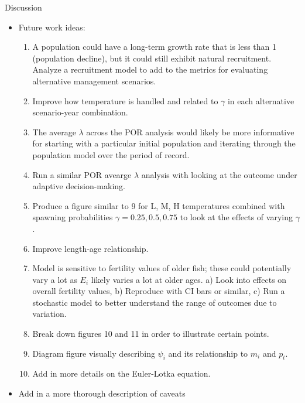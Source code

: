 \documentclass[12pt]{article}
\begin{document}
\begin{section}{Discussion}
\begin{itemize}
\item Future work ideas: 
	\begin{enumerate}
	\item A population could have a long-term growth rate that is less than 1 (population decline), but it could still exhibit natural recruitment.  Analyze a recruitment model to add to the metrics for evaluating alternative management scenarios.
	\item Improve how temperature is handled and related to $\gamma$ in each alternative scenario-year combination.
	\item The average $\lambda$ across the POR analysis would likely be more informative for starting with a particular initial population and iterating through the population model over the period of record.
	\item Run a similar POR avearge $\lambda$ analysis with looking at the outcome under adaptive decision-making.
	\item Produce a figure similar to 9 for L, M, H temperatures combined with spawning probabilities $\gamma=0.25, 0.5, 0.75$ to look at the effects of varying $\gamma$.
	\item Improve length-age relationship.
	\item Model is sensitive to fertility values of older fish; these could potentially vary a lot as $E_i$ likely varies a lot at older ages.  a) Look into effects on overall fertility values, b) Reproduce with CI bars or similar, c) Run a stochastic model to better understand the range of outcomes due to variation.
	\item Break down figures 10 and 11 in order to illustrate certain points.
	\item Diagram figure visually describing $\psi_i$ and its relationship to $m_i$ and $p_t$.
	\item Add in more details on the Euler-Lotka equation.
	\end{enumerate}
\item Add in a more thorough description of caveats
\end{itemize}
\end{section}
\end{document}
